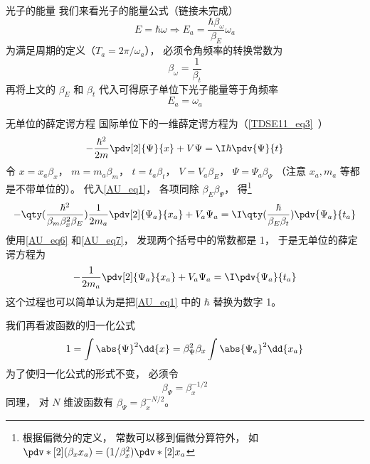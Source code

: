 \begin{example}{光子的能量}
我们来看光子的能量公式（链接未完成）
\begin{equation}
E = \hbar \omega \Longrightarrow E_a = \frac{\hbar\beta_\omega}{\beta_E}\omega_a
\end{equation}
为满足周期的定义（$T_a = 2\pi/\omega_a$）， 必须令角频率的转换常数为
\begin{equation}
\beta_\omega = \frac{1}{\beta_t}
\end{equation}
再将上文的 $\beta_E$ 和 $\beta_t$ 代入可得原子单位下光子能量等于角频率
\begin{equation}\label{AU_eq2}
E_a = \omega_a
\end{equation}
\end{example}

\begin{example}{无单位的薛定谔方程}\label{AU_ex1}
国际单位下的一维薛定谔方程为（\autoref{TDSE11_eq3}~）
\begin{equation}\label{AU_eq1}
-\frac{\hbar^2}{2m} \pdv[2]{\Psi}{x} + V\Psi= \I\hbar \pdv{\Psi}{t}
\end{equation}
令 $x = x_a\beta_x$， $m = m_a\beta_m$， $t = t_a\beta_t$， $V = V_a\beta_E$， $\Psi = \Psi_a \beta_\Psi$ （注意 $x_a, m_a$ 等都是不带单位的）。
代入\autoref{AU_eq1}， 各项同除 $\beta_E\beta_\Psi$， 得\footnote{根据偏微分的定义， 常数可以移到偏微分算符外， 如 $\pdv*[2]{(\beta_x x_a)} = (1/\beta_x^2) \pdv*[2]{x_a}$}
\begin{equation}\label{AU_eq3}
-\qty(\frac{\hbar^2}{\beta_m\beta_x^2\beta_E})\frac{1}{2m_a} \pdv[2]{\Psi_a}{x_a} + V_a\Psi_a= \I\qty(\frac{\hbar}{\beta_E\beta_t})\pdv{\Psi_a}{t_a}
\end{equation}
使用\autoref{AU_eq6} 和\autoref{AU_eq7}， 发现两个括号中的常数都是 1， 于是无单位的薛定谔方程为
\begin{equation}\label{AU_eq4}
-\frac{1}{2m_a} \pdv[2]{\Psi_a}{x_a} + V_a\Psi_a= \I\pdv{\Psi_a}{t_a}
\end{equation}
这个过程也可以简单认为是把\autoref{AU_eq1} 中的 $\hbar$ 替换为数字 1。

我们再看波函数的归一化公式
\begin{equation}
1 = \int \abs{\Psi}^2 \dd{x} = \beta_\Psi^2 \beta_x \int \abs{\Psi_a}^2 \dd{x_a}
\end{equation}
为了使归一化公式的形式不变， 必须令
\begin{equation}\label{AU_eq5}
\beta_\Psi = \beta_x^{-1/2}
\end{equation}
同理， 对 $N$ 维波函数有 $\beta_\Psi = \beta_x^{-N/2}$。
\end{example}

